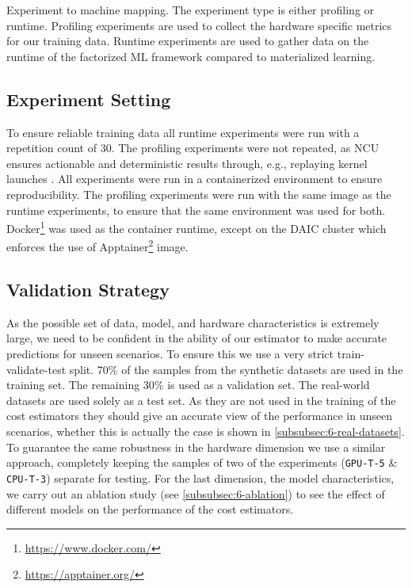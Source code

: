 \begin{table}[ht]
  \centering
  
  \caption[Experiment to machine mapping]{Experiment to machine mapping. The experiment type is either profiling or runtime. Profiling experiments are used to collect the hardware specific metrics for our training data. Runtime experiments are used to gather data on the runtime of the factorized ML framework compared to materialized learning.}
  \label{tab:6-hardware-overview}
\end{table}

\subsection{Experiment Setting}
To ensure reliable training data all runtime experiments were run with a repetition count of $30$. The profiling experiments were not repeated, as NCU ensures actionable and deterministic results through, e.g., replaying kernel launches \cite{nsight_compute}. All experiments were run in a containerized environment to ensure reproducibility. The profiling experiments were run with the same image as the runtime experiments, to ensure that the same environment was used for both. Docker\footnote{\url{https://www.docker.com/}} was used as the container runtime, except on the DAIC cluster which enforces the use of Apptainer\footnote{\url{https://apptainer.org/}} image.

\subsection{Validation Strategy}
\label{subsec:6-validation-strategy}

As the possible set of data, model, and hardware characteristics is extremely large, we need to be confident in the ability of our estimator to make accurate predictions for unseen scenarios. To ensure this we use a very strict train-validate-test split. 70\% of the samples from the synthetic datasets are used in the training set. The remaining 30\% is used as a validation set. The real-world datasets are used solely as a test set. As they are not used in the training of the cost estimators they should give an accurate view of the performance in unseen scenarios, whether this is actually the case is shown in \autoref{subsubsec:6-real-datasets}. To guarantee the same robustness in the hardware dimension we use a similar approach, completely keeping the samples of two of the experiments (\texttt{GPU-T-5} \& \texttt{CPU-T-3}) separate for testing. For the last dimension, the model characteristics, we carry out an ablation study (see \autoref{subsubsec:6-ablation}) to see the effect of different models on the performance of the cost estimators.


